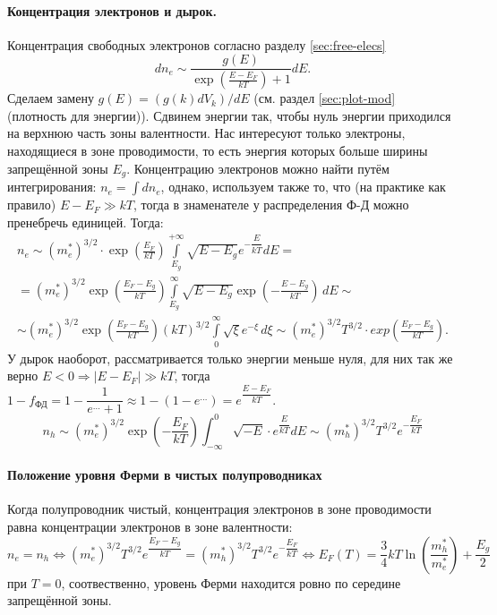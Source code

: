 \paragraph{Концентрация электронов и дырок.} Концентрация свободных электронов
согласно разделу \ref{sec:free-elecs}
\[
  dn_e \sim \frac{g(E)}{\exp \left( \frac{E - E_F}{kT} \right) + 1}dE.
\]
Сделаем замену $ g(E) = (g(k) dV_k)/dE $ (см. раздел \ref{sec:plot-mod} (плотность
для энергии)).
Сдвинем энергии так, чтобы нуль энергии приходился на верхнюю часть зоны валентности. 
Нас интересуют только электроны, находящиеся в зоне проводимости, то есть энергия которых
больше ширины запрещённой зоны $E_g$. Концентрацию электронов можно найти путём интегрирования:
$n_e = \int dn_e$, однако, используем также то, что (на практике как правило) $E-E_F \gg kT$, тогда в знаменателе у
распределения Ф-Д можно пренебречь единицей. Тогда:
\begin{multline*}
  n_e \sim (m^\ast_e)^{3/2}\cdot\exp \left( \frac{E_F}{kT} \right)
  \int\limits_{E_g}^{+\infty} \sqrt{E-E_g} e^{-\dfrac{E}{kT}} dE = \\
  = (m^\ast_e)^{3/2}\exp \left( \frac{E_F - E_g}{kT} \right)
  \int\limits_{E_g}^\infty \sqrt{E - E_g} \exp \left( - \frac{E-E_g}{kT} \right)
  \,dE \sim\\\sim
  (m^\ast_e)^{3/2}\exp \left( \frac{E_F - E_g}{kT} \right) (kT)^{3/2}
  \int\limits_{0}^\infty \sqrt\xi e^{-\xi} \, d\xi
  \sim (m_e^*)^{3/2} T^{3/2} \cdot exp\left(\frac{E_F - E_g}{kT}\right).
\end{multline*}
У дырок наоборот, рассматривается только энергии меньше нуля, для них так же верно
$E<0 \Rightarrow |E-E_F| \gg kT$, тогда
$1 - f_\text{ФД} = 1 - \dfrac{1}{e^{\dots} + 1} \approx 1 - \left( 1 - e^{\dots} \right) = e^{\dfrac{E-E_F}{kT}} $. 
\[
  n_h \sim (m_e^\ast)^{3/2} \exp \left( -\frac{E_F}{kT} \right)  \int_{-\infty}^0 \sqrt{-E} \cdot e^{\dfrac{E}{kT}} dE \sim (m_h^*)^{3/2} T^{3/2} e^{-\dfrac{E_F}{kT}}
\]

\paragraph{Положение уровня Ферми в чистых полупроводниках}

Когда полупроводник чистый, концентрация электронов в зоне проводимости равна концентрации электронов в зоне валентности:
\[
  n_e = n_h \Leftrightarrow (m_e^*)^{3/2} T^{3/2} e^{\dfrac{E_F - E_g}{kT}} = (m_h^*)^{3/2} T^{3/2} e^{-\dfrac{E_F}{kT}} 
  \Leftrightarrow
  E_F(T) = \dfrac{3}{4} kT \ln \left(\dfrac{m_h^*}{m_e^*}\right) + \dfrac{E_g}{2}
\]
при $T = 0$, соотвественно, уровень Ферми находится ровно по середине запрещённой зоны.


